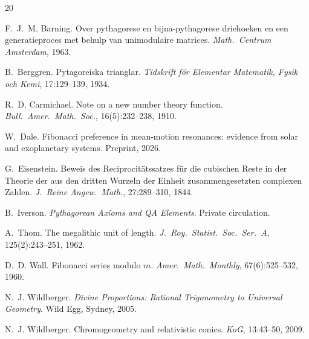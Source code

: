 \documentclass[11pt]{article}
\begin{document}
\begin{thebibliography}{20}

F.~J.~M. Barning.
\newblock Over pythagorese en bijna-pythagorese driehoeken en een generatieproces met behulp van unimodulaire matrices.
\newblock \emph{Math.\ Centrum Amsterdam}, 1963.

B.~Berggren.
\newblock Pytagoreiska trianglar.
\newblock \emph{Tidskrift f\"or Elementar Matematik, Fysik och Kemi}, 17:129--139, 1934.

R.~D. Carmichael.
\newblock Note on a new number theory function.
\newblock \emph{Bull.\ Amer.\ Math.\ Soc.}, 16(5):232--238, 1910.

W.~Dale.
\newblock Fibonacci preference in mean-motion resonances: evidence from solar and exoplanetary systems.
\newblock Preprint, 2026.

G.~Eisenstein.
\newblock Beweis des Reciprocit\"atssatzes f\"ur die cubischen Reste in der Theorie der aus den dritten Wurzeln der Einheit zusammengesetzten complexen Zahlen.
\newblock \emph{J.\ Reine Angew.\ Math.}, 27:289--310, 1844.

B.~Iverson.
\newblock \emph{Pythagorean Axioms and QA Elements}.
\newblock Private circulation.

A.~Thom.
\newblock The megalithic unit of length.
\newblock \emph{J.\ Roy.\ Statist.\ Soc.\ Ser.\ A}, 125(2):243--251, 1962.

D.~D. Wall.
\newblock Fibonacci series modulo $m$.
\newblock \emph{Amer.\ Math.\ Monthly}, 67(6):525--532, 1960.

N.~J. Wildberger.
\newblock \emph{Divine Proportions: Rational Trigonometry to Universal Geometry}.
\newblock Wild Egg, Sydney, 2005.

N.~J. Wildberger.
\newblock Chromogeometry and relativistic conics.
\newblock \emph{KoG}, 13:43--50, 2009.

\end{thebibliography}
\end{document}
